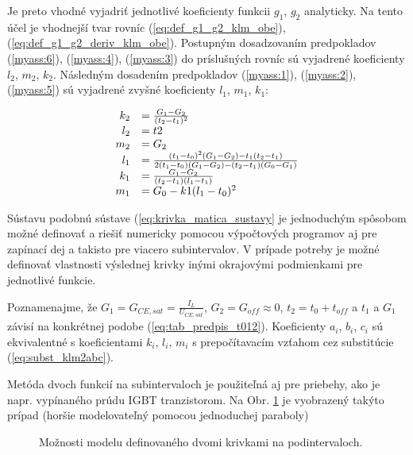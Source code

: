 Je preto vhodné vyjadriť jednotlivé koeficienty funkcii $g_1$, $g_2$ analyticky. Na tento účel je vhodnejší tvar rovníc (\ref{eq:def_g1_g2_klm_obe}), (\ref{eq:def_g1_g2_deriv_klm_obe}).
Postupným dosadzovaním predpokladov (\ref{myass:6}), (\ref{myass:4}), (\ref{myass:3}) do príslušných rovníc sú vyjadrené koeficienty $l_2$, $m_2$, $k_2$.
Následným dosadením predpokladov (\ref{myass:1}), (\ref{myass:2}), (\ref{myass:5}) sú vyjadrené zvyšné koeficienty $l_1$, $m_1$, $k_1$:

\begin{equation}
	\begin{array}{r l}
		k_2& = \frac{G_1-G_2}{(t_2-t_1)^2} \\
		l_2& = t2 \\
		m_2& = G_2 \\
		l_1& = \frac{(t_1-t_0)^2 (G_1 - G_2) - t_1(t_2-t_1)}{2(t_1-t_0)(G_1-G_2) - (t_2-t_1)(G_0-G_1)} \\
		k_1& = \frac{G_1-G_2}{(t_2-t_1)(l_1-t_1)} \\
		m_1& = G_0 - k1(l_1 - t_0)^2
	\end{array}
	\label{eq:krivka_riesenie_klm}
\end{equation}

Sústavu podobnú sústave (\ref{eq:krivka_matica_sustavy} je jednoduchým spôsobom možné definovať a riešiť numericky pomocou výpočtových programov aj pre zapínací dej a takisto pre viacero subintervalov. V prípade potreby je možné definovať vlastnosti výslednej krivky inými okrajovými podmienkami pre jednotlivé funkcie.

Poznamenajme, že $G_1 = G_{CE,sat}=\frac{I_L}{U_{CE,sat}}$, $G_2 = G_{off} \approx 0$, $t_2 = t_0+t_{off}$ a $t_1$ a $G_1$ závisí na konkrétnej podobe (\ref{eq:tab_predpis_t012}). Koeficienty $a_i$, $b_i$, $c_i$ sú ekvivalentné s koeficientami $k_i$, $l_i$, $m_i$ s prepočítavacím vzťahom cez substitúcie (\ref{eq:subst_klm2abc}).



Metóda dvoch funkcií na subintervaloch je použiteľná aj pre  priebehy, ako je napr.  vypínaného prúdu IGBT tranzistorom. Na Obr. \ref{fig:tail} je vyobrazený takýto prípad (horšie modelovateľný pomocou jednoduchej paraboly)

\begin{figure}
	\centering
	
	\caption{Možnosti modelu definovaného dvomi krivkami na podintervaloch.}
	\label{fig:tail}
\end{figure}

